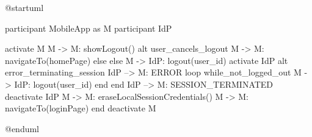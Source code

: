 @startuml

participant MobileApp as M
participant IdP

activate M
M -> M: showLogout()
alt user_cancels_logout
M -> M: navigateTo(homePage)
else else
M -> IdP: logout(user_id)
activate IdP
alt error_terminating_session
IdP --> M: ERROR
loop while_not_logged_out
M -> IdP: logout(user_id)
end
end
IdP --> M: SESSION_TERMINATED
deactivate IdP
M -> M: eraseLocalSessionCredentials()
M -> M: navigateTo(loginPage)
end
deactivate M

@enduml